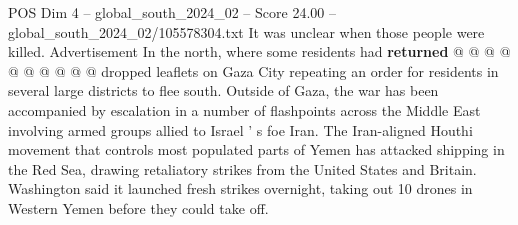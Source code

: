 \begin{textsample}{POS Dim 4 – global\_south\_2024\_02 – Score 24.00 – global\_south\_2024\_02/105578304.txt}
It was unclear when those people were killed.
Advertisement In the north, where some residents had \textbf{returned} @ @ @ @ @ @ @ @ @ @ dropped leaflets on Gaza City repeating an order for residents in several large districts to flee south.
Outside of Gaza, the war has been accompanied by escalation in a number of flashpoints across the Middle East involving armed groups allied to Israel ' s foe Iran.
The Iran-aligned Houthi movement that controls most populated parts of Yemen has attacked shipping in the Red Sea, drawing retaliatory strikes from the United States and Britain.
Washington said it launched fresh strikes overnight, taking out 10 drones in Western Yemen before they could take off.

\end{textsample}

